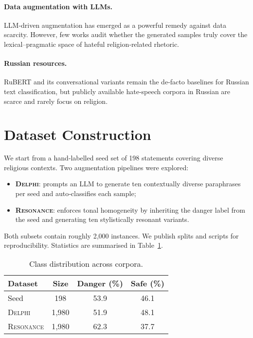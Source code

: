 \documentclass{article}
\begin{document}
\paragraph{Data augmentation with LLMs.} LLM‑driven augmentation has emerged as a powerful remedy against data scarcity\cite{ding2024augmentation}. However, few works audit whether the generated samples truly cover the lexical–pragmatic space of hateful religion‑related rhetoric.

\paragraph{Russian resources.} RuBERT and its conversational variants remain the de‑facto baselines for Russian text classification\cite{rubert}, but publicly available hate‑speech corpora in Russian are scarce and rarely focus on religion.

\section{Dataset Construction}
We start from a hand‑labelled seed set of 198 statements covering diverse religious contexts. Two augmentation pipelines were explored:
\begin{itemize}
    \item \textbf{\textsc{Delphi}}: prompts an LLM to generate ten contextually diverse paraphrases per seed and auto‑classifies each sample\cite{delphi};
    \item \textbf{\textsc{Resonance}}: enforces tonal homogeneity by inheriting the danger label from the seed and generating ten stylistically resonant variants\cite{resonance}.
\end{itemize}
Both subsets contain roughly 2,000 instances. We publish splits and scripts for reproducibility. Statistics are summarised in Table~\ref{tab:data}.

\begin{table}[h]
\centering
\begin{tabular}{lccc}
\hline
Dataset & Size & Danger (\%) & Safe (\%) \\
\hline
Seed & 198 & 53.9 & 46.1 \\
\textsc{Delphi} & 1,980 & 51.9 & 48.1 \\
\textsc{Resonance} & 1,980 & 62.3 & 37.7 \\ \hline
\end{tabular}
\caption{Class distribution across corpora.}
\label{tab:data}
\end{table}
\end{document}
